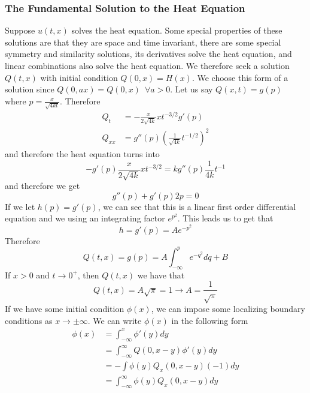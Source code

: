 \documentclass{article}
\theoremstyle{definition}
\begin{document}
\subsubsection{The Fundamental Solution to the Heat Equation}
Suppose $u(t,x)$ solves the heat equation. Some special properties of these solutions are that they are space and time invariant, there are some special symmetry and similarity solutions, its derivatives solve the heat equation, and linear combinations also solve the heat equation. We therefore seek a solution $Q(t,x)$ with initial condition $Q(0,x)=H(x)$. We choose this form of a solution since $Q(0,ax)=Q(0,x)\,\,\, \forall a>0$. Let us say $Q(x,t)=g(p) $ where $p=\frac{x}{\sqrt{4kt}}$. Therefore 
\begin{equation*}
    \begin{split}
        Q_t &=-\frac{x}{2\sqrt{4k}}xt^{-3/2}g'(p) \\
        Q_{xx}&= g''(p)\left(\frac{1}{\sqrt{4k}}t^{-1/2}\right)^2
    \end{split}
\end{equation*}
and therefore the heat equation turns into 
\begin{equation*}
    -g'(p)\frac{x}{2\sqrt{4k}}xt^{-3/2} = kg''(p)\frac{1}{4k}t^{-1}
\end{equation*}
and therefore we get 
\begin{equation*}
    g''(p)+g'(p)2p=0
\end{equation*}
If we let $h(p)=g'(p)$, we can see that this is a linear first order differential equation and we using an integrating factor $e^{p^2}$. This leads us to get that 
\begin{equation*}
    h=g'(p)=Ae^{-p^2}
\end{equation*}
Therefore 
\begin{equation}
    Q(t,x)=g(p)=A\int^p_{-\infty} e^{-q^2}dq+B
\end{equation}
If $x>0$ and $t\rightarrow 0^+$, then $Q(t,x)$ we have that 
\begin{equation}
    Q(t,x)=A\sqrt{\pi}=1 \to A=\frac{1}{\sqrt\pi}
\end{equation}
If we have some initial condition $\phi (x)$, we can impose some localizing boundary conditions as $x\to \pm \infty$. We can write $\phi(x)$ in the following form 
\begin{equation*}
    \begin{split}
        \phi(x)&=\int^x_{-\infty}\phi'(y)dy \\&= \int^\infty_{-\infty}Q(0,x-y) \phi '(y)dy \\
        &= - \int\phi(y)Q_x(0,x-y) (-1)dy \\
        &=\int^\infty_{-\infty}\phi (y)Q_x(0,x-y)dy
    \end{split}
\end{equation*}
\end{document}
